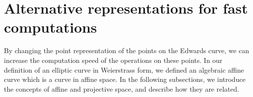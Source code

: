\section{Alternative representations for fast computations} \label{sec: Alternative representations for fast computations}
By changing the point representation of the points on the Edwards curve, we can increase the computation speed of the operations on these points.
In our definition of an elliptic curve in Weierstrass form, we defined an algebraic affine curve which is a curve in affine space.
In the following subsections, we introduce the concepts of affine and projective space, and describe how they are related.

